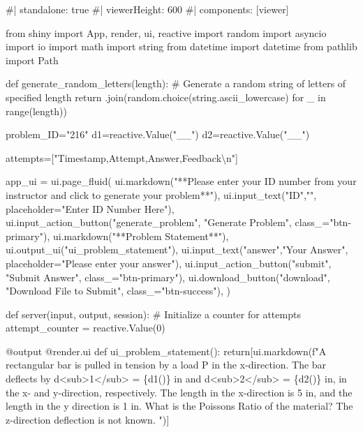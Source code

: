 \documentclass[
  letterpaper,
  DIV=11,
  numbers=noendperiod]{scrreprt}
\newenvironment{Shaded}{\begin{snugshade}}{\end{snugshade}}
\newcommand{\NormalTok}[1]{\textcolor[rgb]{0.00,0.23,0.31}{#1}}
\begin{document}
\begin{Shaded}
\begin{Highlighting}[]
\NormalTok{\#| standalone: true}
\NormalTok{\#| viewerHeight: 600}
\NormalTok{\#| components: [viewer]}

\NormalTok{from shiny import App, render, ui, reactive}
\NormalTok{import random}
\NormalTok{import asyncio}
\NormalTok{import io}
\NormalTok{import math}
\NormalTok{import string}
\NormalTok{from datetime import datetime}
\NormalTok{from pathlib import Path}

\NormalTok{def generate\_random\_letters(length):}
\NormalTok{    \# Generate a random string of letters of specified length}
\NormalTok{    return \textquotesingle{}\textquotesingle{}.join(random.choice(string.ascii\_lowercase) for \_ in range(length)) }

\NormalTok{problem\_ID="216"}
\NormalTok{d1=reactive.Value("\_\_")}
\NormalTok{d2=reactive.Value("\_\_")}


\NormalTok{attempts=["Timestamp,Attempt,Answer,Feedback\textbackslash{}n"]}

\NormalTok{app\_ui = ui.page\_fluid(}
\NormalTok{    ui.markdown("**Please enter your ID number from your instructor and click to generate your problem**"),}
\NormalTok{    ui.input\_text("ID","", placeholder="Enter ID Number Here"),}
\NormalTok{    ui.input\_action\_button("generate\_problem", "Generate Problem", class\_="btn{-}primary"),}
\NormalTok{    ui.markdown("**Problem Statement**"),}
\NormalTok{    ui.output\_ui("ui\_problem\_statement"),}
\NormalTok{    ui.input\_text("answer","Your Answer", placeholder="Please enter your answer"),}
\NormalTok{    ui.input\_action\_button("submit", "Submit Answer", class\_="btn{-}primary"),}
\NormalTok{    ui.download\_button("download", "Download File to Submit", class\_="btn{-}success"),}
\NormalTok{)}


\NormalTok{def server(input, output, session):}
\NormalTok{    \# Initialize a counter for attempts}
\NormalTok{    attempt\_counter = reactive.Value(0)}

\NormalTok{    @output}
\NormalTok{    @render.ui}
\NormalTok{    def ui\_problem\_statement():}
\NormalTok{        return[ui.markdown(f"A rectangular bar is pulled in tension by a load P in the x{-}direction. The bar deflects by d\textless{}sub\textgreater{}1\textless{}/sub\textgreater{} = \{d1()\} in and d\textless{}sub\textgreater{}2\textless{}/sub\textgreater{} = \{d2()\} in, in the x{-} and y{-}direction, respectively. The length in the x{-}direction is 5 in, and the length in the y direction is 1 in. What is the Poisson\textquotesingle{}s Ratio of the material? The z{-}direction deflection is not known. ")]}
    

\end{Highlighting}
\end{Shaded}
\end{document}
